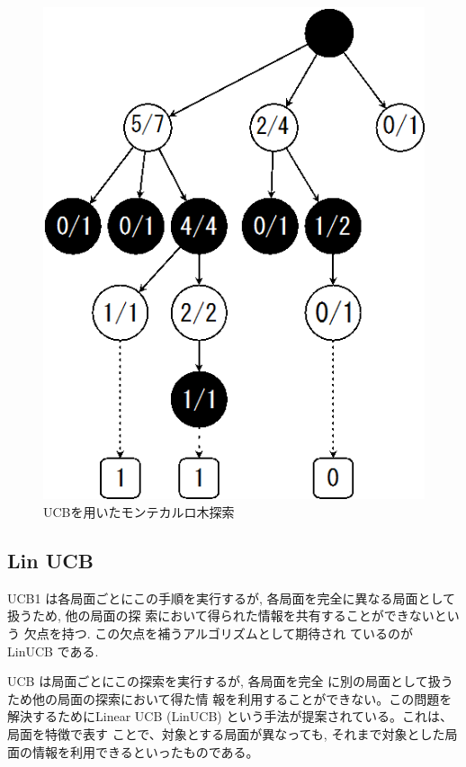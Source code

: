\begin{figure}[h]
 \centering
 \includegraphics[keepaspectratio, scale=0.75,bb=0 0 304 387]
      {img/UCB.png}
 \caption{UCBを用いたモンテカルロ木探索}
 \label{monte2}
\end{figure}

\subsection{Lin UCB}
UCB1 は各局面ごとにこの手順を実行するが, 各局面を完全に異なる局面として扱うため, 他の局面の探 索において得られた情報を共有することができないという 欠点を持つ. この欠点を補うアルゴリズムとして期待され ているのが LinUCB である.

UCB は局面ごとにこの探索を実行するが, 各局面を完全 に別の局面として扱うため他の局面の探索において得た情 報を利用することができない。この問題を解決するためにLinear UCB (LinUCB) \cite{LinUCB} という手法が提案されている。これは、局面を特徴で表す ことで、対象とする局面が異なっても, それまで対象とした局面の情報を利用できるといったものである。

